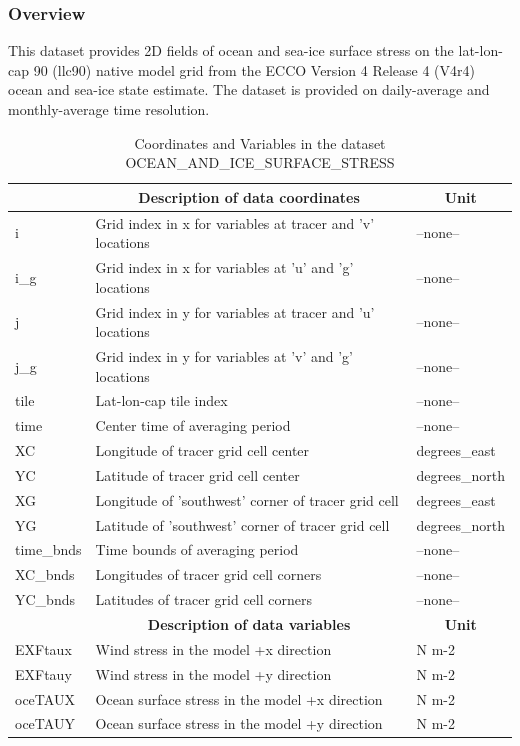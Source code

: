 \subsubsection{Overview}
This dataset provides 2D fields of ocean and sea-ice surface stress on the lat-lon-cap 90 (llc90) native model grid from the ECCO Version 4 Release 4 (V4r4) ocean and sea-ice state estimate. The dataset is provided on daily-average and monthly-average time resolution. 
\begin{longtable}{|m{}|m{}|m{}|}
\caption{Coordinates and Variables in the dataset OCEAN\_AND\_ICE\_SURFACE\_STRESS}
\label{tab:table-OCEAN_AND_ICE_SURFACE_STRESS-fields} \\ 
\hline \endhead \hline \endfoot
\rowcolor{lightgray} \multicolumn{1}{|c|}{\textbf{Coordinates}} & \multicolumn{1}{|c|}{\textbf{Description of data coordinates}} &  \multicolumn{1}{|c|}{\textbf{Unit}}\\ \hline
i &Grid index in x for variables at tracer and 'v' locations &--none--  \\ \hline
i\_g &Grid index in x for variables at 'u' and 'g' locations &--none--  \\ \hline
j &Grid index in y for variables at tracer and 'u' locations &--none--  \\ \hline
j\_g &Grid index in y for variables at 'v' and 'g' locations &--none--  \\ \hline
tile &Lat-lon-cap tile index &--none--  \\ \hline
time &Center time of averaging period &--none--  \\ \hline
XC &Longitude of tracer grid cell center &degrees\_east  \\ \hline
YC &Latitude of tracer grid cell center &degrees\_north  \\ \hline
XG &Longitude of 'southwest' corner of tracer grid cell &degrees\_east  \\ \hline
YG &Latitude of 'southwest' corner of tracer grid cell &degrees\_north  \\ \hline
time\_bnds &Time bounds of averaging period &--none--  \\ \hline
XC\_bnds &Longitudes of tracer grid cell corners &--none--  \\ \hline
YC\_bnds &Latitudes of tracer grid cell corners &--none--  \\ \hline
\rowcolor{lightgray} \multicolumn{1}{|c|}{\textbf{Variables}} & \multicolumn{1}{|c|}{\textbf{Description of data variables}} &  \multicolumn{1}{|c|}{\textbf{Unit}}\\ \hline
EXFtaux &Wind stress in the model +x direction &N m-2  \\ \hline
EXFtauy &Wind stress in the model +y direction &N m-2  \\ \hline
oceTAUX &Ocean surface stress in the model +x direction &N m-2  \\ \hline
oceTAUY &Ocean surface stress in the model +y direction &N m-2  \\ \hline
\end{longtable}

